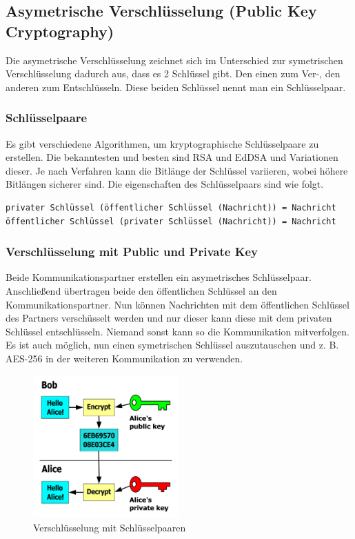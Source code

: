 \clearpage

\subsection{Asymetrische Verschlüsselung (Public Key Cryptography)}

Die asymetrische Verschlüsselung zeichnet sich im Unterschied zur symetrischen
Verschlüsselung dadurch aus, dass es 2 Schlüssel gibt. Den einen zum Ver-, den anderen
zum Entschlüsseln. Diese beiden Schlüssel nennt man ein Schlüsselpaar.

\subsubsection{Schlüsselpaare}
Es gibt verschiedene Algorithmen, um kryptographische Schlüsselpaare zu erstellen.
Die bekanntesten und besten sind RSA und EdDSA und Variationen dieser.
Je nach Verfahren kann die Bitlänge der Schlüssel variieren, wobei höhere Bitlängen
sicherer sind. Die eigenschaften des Schlüsselpaars sind wie folgt.

\begin{lstlisting}
privater Schlüssel (öffentlicher Schlüssel (Nachricht)) = Nachricht
öffentlicher Schlüssel (privater Schlüssel (Nachricht)) = Nachricht 
\end{lstlisting}

\subsubsection{Verschlüsselung mit Public und Private Key}

Beide Kommunikationspartner erstellen ein asymetrisches Schlüsselpaar.
Anschließend übertragen beide den öffentlichen Schlüssel an den Kommunikationspartner.
Nun können Nachrichten mit dem öffentlichen Schlüssel des Partners verschüsselt werden
und nur dieser kann diese mit dem privaten Schlüssel entschlüsseln. Niemand sonst kann
so die Kommunikation mitverfolgen. Es ist auch möglich, nun einen symetrischen Schlüssel
auszutauschen und z. B. AES-256 in der weiteren Kommunikation zu verwenden.

\begin{figure}[H]
    \centering
    \includegraphics[width=0.5\textwidth]{images/public-key-encryption.png}
    \caption{Verschlüsselung mit Schlüsselpaaren}
\end{figure}

